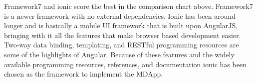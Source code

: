 Framework7 and ionic score the best in the comparison chart above. Framework7 is a newer framework with no external dependencies. Ionic has been around longer and is basically a mobile UI framework that is built upon AngularJS, bringing with it all the features that make browser based development easier. Two-way data binding, templating, and RESTful programming resources are some of the highlights of Angular. Because of these features and the widely available programming resources, references, and documentation ionic has been chosen as the framework to implement the MDApp.

